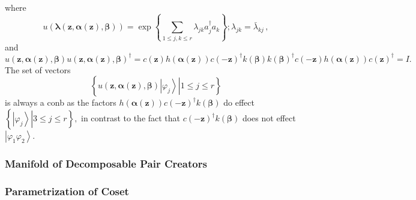 \documentclass[aps,preprint]{revtex4}%
\begin{document}
where%
\begin{equation}
u\left(  \mathbf{\lambda}\left(  \mathbf{z,\alpha\left(  \mathbf{z}\right)
,\beta}\right)  \right)  =\exp\left\{  \sum\limits_{1\leq j,k\leq r}%
\lambda_{jk}a_{j}^{\dagger}a_{k}\right\}  ;\lambda_{jk}=\bar{\lambda}_{kj}\,,
\end{equation}
and
\begin{equation}
u\left(  \mathbf{z,\alpha\left(  \mathbf{z}\right)  ,\beta}\right)  u\left(
\mathbf{z,\alpha\left(  \mathbf{z}\right)  ,\beta}\right)  ^{\dagger}=c\left(
\mathbf{z}\right)  h\left(  \mathbf{\alpha}\left(  \mathbf{z}\right)  \right)
c\left(  -\mathbf{z}\right)  ^{\dagger}k\left(  \mathbf{\beta}\right)
k\left(  \mathbf{\beta}\right)  ^{\dagger}c\left(  -\mathbf{z}\right)
h\left(  \mathbf{\alpha}\left(  \mathbf{z}\right)  \right)  c\left(
\mathbf{z}\right)  ^{\dagger}=I.
\end{equation}
The set of vectors
\begin{equation}
\left\{  \left.  u\left(  \mathbf{z,\alpha\left(  \mathbf{z}\right)  ,\beta
}\right)  \left\vert \varphi_{j}\right\rangle \right\vert 1\leq j\leq
r\right\}
\end{equation}
is always a conb as the factors $h\left(  \mathbf{\alpha}\left(
\mathbf{z}\right)  \right)  c\left(  -\mathbf{z}\right)  ^{\dagger}k\left(
\mathbf{\beta}\right)  $ do effect $\left\{  \left.  \left\vert \varphi
_{j}\right\rangle \right\vert 3\leq j\leq r\right\}  ,$ in contrast to the
fact that $c\left(  -\mathbf{z}\right)  ^{\dagger}k\left(  \mathbf{\beta
}\right)  $ does not effect $\left\vert \varphi_{1}\varphi_{2}\right\rangle .$

\subsubsection{Manifold of Decomposable Pair Creators}

\subsubsection{Parametrization of Coset}
\end{document}
